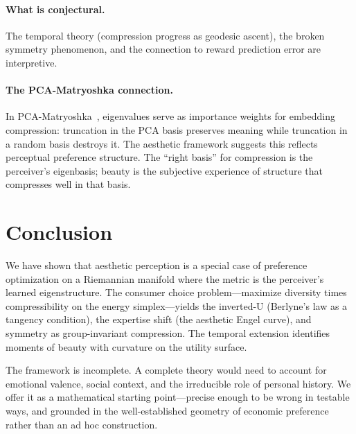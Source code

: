 \documentclass[journal]{IEEEtran}
\theoremstyle{definition}
\theoremstyle{remark}
\begin{document}
\paragraph{What is conjectural.}
The temporal theory (compression progress as geodesic ascent), the
broken symmetry phenomenon, and the connection to reward prediction
error are interpretive.

\paragraph{The PCA-Matryoshka connection.}
In PCA-Matryoshka~\cite{bond2026pcamatryoshka}, eigenvalues serve
as importance weights for embedding compression: truncation in the
PCA basis preserves meaning while truncation in a random basis
destroys it.  The aesthetic framework suggests this reflects
perceptual preference structure.  The ``right basis'' for
compression is the perceiver's eigenbasis; beauty is the subjective
experience of structure that compresses well in that basis.


\section{Conclusion}
\label{sec:conclusion}

We have shown that aesthetic perception is a special case of
preference optimization on a Riemannian manifold where the metric
is the perceiver's learned eigenstructure.  The consumer choice
problem---maximize diversity times compressibility on the energy
simplex---yields the inverted-U (Berlyne's law as a tangency
condition), the expertise shift (the aesthetic Engel curve), and
symmetry as group-invariant compression.  The temporal extension
identifies moments of beauty with curvature on the utility surface.

The framework is incomplete.  A complete theory would need to
account for emotional valence, social context, and the irreducible
role of personal history.  We offer it as a mathematical starting
point---precise enough to be wrong in testable ways, and grounded
in the well-established geometry of economic preference rather than
an ad hoc construction.
\end{document}
